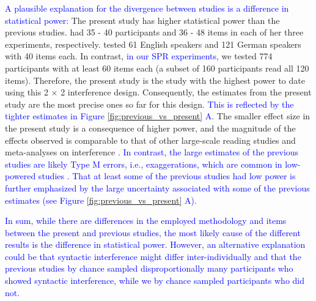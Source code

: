 \documentclass[a4paper, man, floatsintext]{apa7}
\begin{document}
{\textcolor{blue}{A plausible explanation for the divergence between studies is a difference in statistical power:} The present study has higher statistical power than the previous studies. \citet{vandyke07} had 35 - 40 participants and 36 - 48 items in each of her three experiments, respectively. \textcite{mertzen} tested 61 English speakers and 121 German speakers with 40 items each. In contrast, \textcolor{blue}{in our SPR experiments,} we tested 774 participants with at least 60 items each (a subset of 160 participants read all 120 items). Therefore, the present study is the study with the highest power to date using this 2 $\times$ 2 interference design. Consequently, the estimates from the present study are the most precise ones so far for this design. \textcolor{blue}{This is reflected by the tighter estimates in Figure \ref{fig:previous_vs_present} A}. The smaller effect size in the present study is a consequence of higher power, and the magnitude of the effects observed is comparable to that of other large-scale reading studies \citep{nicenboim} and meta-analyses on interference \citep{jaeger_etal_2017}. \textcolor{blue}{In contrast, the large estimates of the previous studies are likely Type M errors, i.e., exaggerations, which are common in low-powered studies \parencite{gelman_carlin}. That at least some of the previous studies had low power is further emphasized by the large uncertainty associated with some of the previous estimates (see Figure \ref{fig:previous_vs_present} A).}

\textcolor{blue}{In sum, while there are differences in the employed methodology and items between the present and previous studies, the most likely cause of the different results is the difference in statistical power. However, an alternative explanation could be that syntactic interference might differ inter-individually \parencite{yadav2021individual} and that the previous studies by chance sampled disproportionally many participants who showed syntactic interference, while we by chance sampled participants who did not.} 

\label{not_an_anomaly}

}
\end{document}

